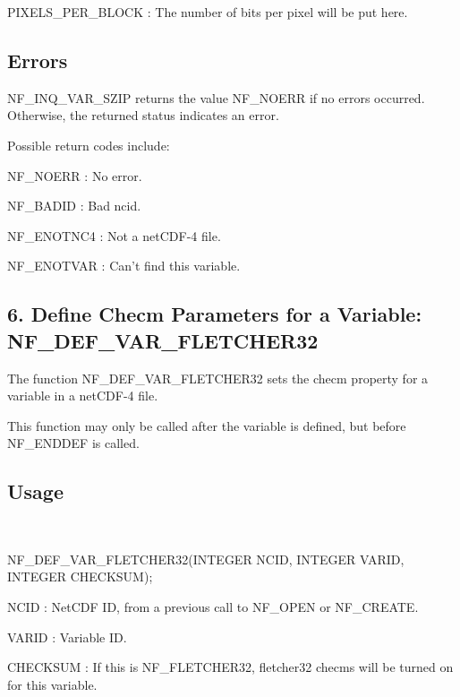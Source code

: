 {\ttfamily P\+I\+X\+E\+L\+S\+\_\+\+P\+E\+R\+\_\+\+B\+L\+O\+CK} \+: The number of bits per pixel will be put here.

\subsection*{Errors }

N\+F\+\_\+\+I\+N\+Q\+\_\+\+V\+A\+R\+\_\+\+S\+Z\+IP returns the value N\+F\+\_\+\+N\+O\+E\+RR if no errors occurred. Otherwise, the returned status indicates an error.

Possible return codes include\+:

{\ttfamily N\+F\+\_\+\+N\+O\+E\+RR} \+: No error.

{\ttfamily N\+F\+\_\+\+B\+A\+D\+ID} \+: Bad ncid.

{\ttfamily N\+F\+\_\+\+E\+N\+O\+T\+N\+C4} \+: Not a net\+C\+D\+F-\/4 file.

{\ttfamily N\+F\+\_\+\+E\+N\+O\+T\+V\+AR} \+: Can’t find this variable.

\subsection*{6. Define Checm Parameters for a Variable\+: {\ttfamily N\+F\+\_\+\+D\+E\+F\+\_\+\+V\+A\+R\+\_\+\+F\+L\+E\+T\+C\+H\+E\+R32} }

The function N\+F\+\_\+\+D\+E\+F\+\_\+\+V\+A\+R\+\_\+\+F\+L\+E\+T\+C\+H\+E\+R32 sets the checm property for a variable in a net\+C\+D\+F-\/4 file.

This function may only be called after the variable is defined, but before N\+F\+\_\+\+E\+N\+D\+D\+EF is called.

\subsection*{Usage }

 

N\+F\+\_\+\+D\+E\+F\+\_\+\+V\+A\+R\+\_\+\+F\+L\+E\+T\+C\+H\+E\+R32(\+I\+N\+T\+E\+G\+E\+R N\+C\+I\+D, I\+N\+T\+E\+G\+E\+R V\+A\+R\+I\+D, I\+N\+T\+E\+G\+E\+R C\+H\+E\+C\+K\+S\+U\+M);

{\ttfamily N\+C\+ID} \+: Net\+C\+DF ID, from a previous call to N\+F\+\_\+\+O\+P\+EN or N\+F\+\_\+\+C\+R\+E\+A\+TE.

{\ttfamily V\+A\+R\+ID} \+: Variable ID.

{\ttfamily C\+H\+E\+C\+K\+S\+UM} \+: If this is N\+F\+\_\+\+F\+L\+E\+T\+C\+H\+E\+R32, fletcher32 checms will be turned on for this variable.

